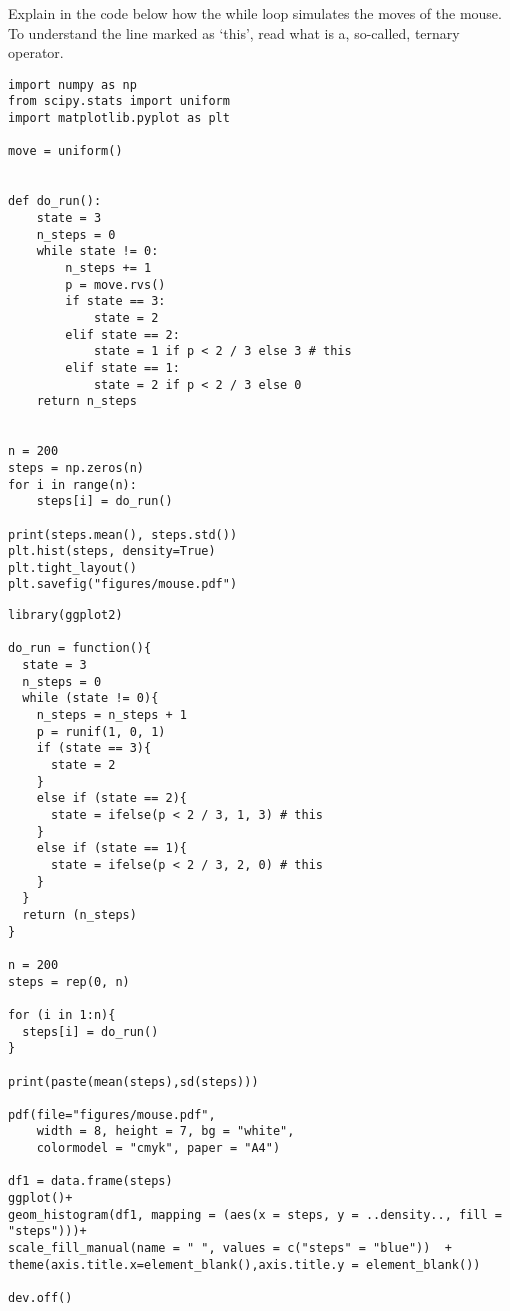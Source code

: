 \begin{exercise}
Explain in the code below how the while loop simulates the moves of the mouse.  To understand the line marked as `this', read what is a, so-called, ternary operator.
\begin{verbatim}
import numpy as np
from scipy.stats import uniform
import matplotlib.pyplot as plt

move = uniform()


def do_run():
    state = 3
    n_steps = 0
    while state != 0:
        n_steps += 1
        p = move.rvs()
        if state == 3:
            state = 2
        elif state == 2:
            state = 1 if p < 2 / 3 else 3 # this
        elif state == 1:
            state = 2 if p < 2 / 3 else 0
    return n_steps


n = 200
steps = np.zeros(n)
for i in range(n):
    steps[i] = do_run()

print(steps.mean(), steps.std())
plt.hist(steps, density=True)
plt.tight_layout()
plt.savefig("figures/mouse.pdf")
\end{verbatim}

\begin{verbatim}
library(ggplot2)

do_run = function(){
  state = 3
  n_steps = 0
  while (state != 0){
    n_steps = n_steps + 1
    p = runif(1, 0, 1)
    if (state == 3){
      state = 2
    }
    else if (state == 2){
      state = ifelse(p < 2 / 3, 1, 3) # this
    }
    else if (state == 1){
      state = ifelse(p < 2 / 3, 2, 0) # this
    }
  }
  return (n_steps)
}

n = 200
steps = rep(0, n)

for (i in 1:n){
  steps[i] = do_run()
}

print(paste(mean(steps),sd(steps)))

pdf(file="figures/mouse.pdf",
    width = 8, height = 7, bg = "white",
    colormodel = "cmyk", paper = "A4")

df1 = data.frame(steps)
ggplot()+
geom_histogram(df1, mapping = (aes(x = steps, y = ..density.., fill = "steps")))+
scale_fill_manual(name = " ", values = c("steps" = "blue"))  +
theme(axis.title.x=element_blank(),axis.title.y = element_blank())

dev.off()
\end{verbatim}

\end{exercise}
